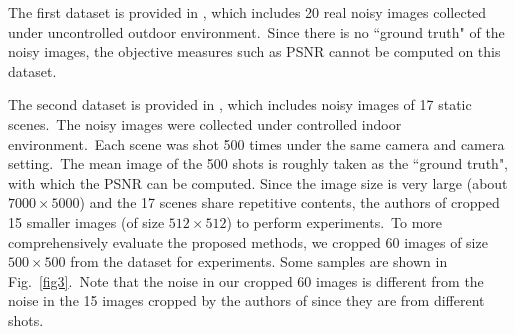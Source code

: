 \documentclass[10pt,twocolumn,letterpaper]{article}
\begin{document}
The first dataset is provided in \cite{ncwebsite}, which includes 20 real noisy images collected under uncontrolled outdoor environment.\ Since there is no ``ground truth" of the noisy images, the objective measures such as PSNR cannot be computed on this dataset. 

The second dataset is provided in \cite{crosschannel2016}, which includes noisy images of 17 static scenes.\ The noisy images were collected under controlled indoor environment.\ Each scene was shot 500 times under the same camera and camera setting.\ The mean image of the 500 shots is roughly taken as the ``ground truth", with which the PSNR can be computed. Since the image size is very large (about $7000\times5000$) and the 17 scenes share repetitive contents, the authors of \cite{crosschannel2016} cropped 15 smaller images (of size $512\times512$) to perform experiments.\ To more comprehensively evaluate the proposed methods, we cropped 60 images of size $500\times500$ from the dataset for experiments. Some samples are shown in Fig.\ \ref{fig3}.\ Note that the noise in our cropped 60 images is different from the noise in the 15 images cropped by the authors of \cite{crosschannel2016} since they are from different shots.
\end{document}
